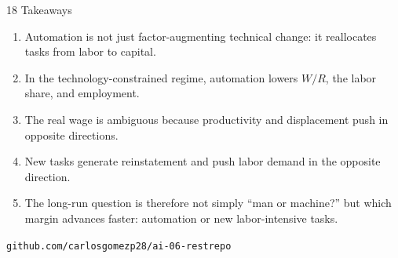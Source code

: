 \documentclass[aspectratio=169,11pt]{beamer}
\begin{document}

\begin{frame}{18 \textperiodcentered{} Takeaways}

  \begin{enumerate}\small

    \item Automation is not just factor-augmenting technical change:
    it reallocates tasks from labor to capital.

    \item In the technology-constrained regime, automation lowers
    $W/R$, the labor share, and employment.

    \item The real wage is ambiguous because productivity and
    displacement push in opposite directions.

    \item New tasks generate reinstatement and push labor demand
    in the opposite direction.

    \item The long-run question is therefore not simply
    ``man or machine?'' but which margin advances faster:
    automation or new labor-intensive tasks.

  \end{enumerate}

  \medskip

  \begin{center}
    \small
    \texttt{github.com/carlosgomezp28/ai-06-restrepo}
  \end{center}

\end{frame}
\end{document}
